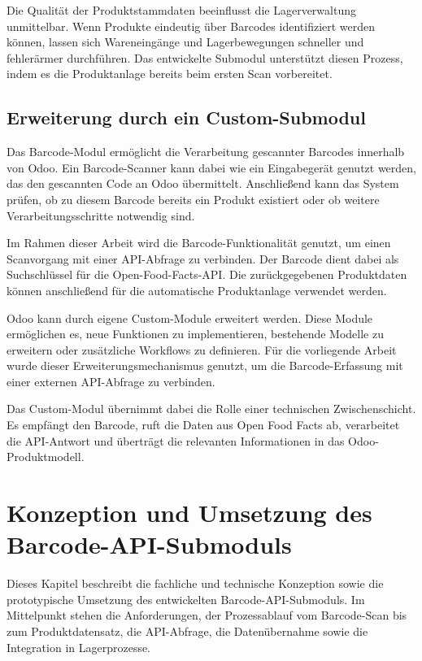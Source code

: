 \documentclass[12pt,a4paper]{article}
\begin{document}
Die Qualität der Produktstammdaten beeinflusst die Lagerverwaltung unmittelbar. Wenn Produkte eindeutig über Barcodes identifiziert werden können, lassen sich Wareneingänge und Lagerbewegungen schneller und fehlerärmer durchführen. Das entwickelte Submodul unterstützt diesen Prozess, indem es die Produktanlage bereits beim ersten Scan vorbereitet.

\subsection{Erweiterung durch ein Custom-Submodul}

Das Barcode-Modul ermöglicht die Verarbeitung gescannter Barcodes innerhalb von Odoo. Ein Barcode-Scanner kann dabei wie ein Eingabegerät genutzt werden, das den gescannten Code an Odoo übermittelt. Anschließend kann das System prüfen, ob zu diesem Barcode bereits ein Produkt existiert oder ob weitere Verarbeitungsschritte notwendig sind.

Im Rahmen dieser Arbeit wird die Barcode-Funktionalität genutzt, um einen Scanvorgang mit einer API-Abfrage zu verbinden. Der Barcode dient dabei als Suchschlüssel für die Open-Food-Facts-API. Die zurückgegebenen Produktdaten können anschließend für die automatische Produktanlage verwendet werden.

Odoo kann durch eigene Custom-Module erweitert werden. Diese Module ermöglichen es, neue Funktionen zu implementieren, bestehende Modelle zu erweitern oder zusätzliche Workflows zu definieren. Für die vorliegende Arbeit wurde dieser Erweiterungsmechanismus genutzt, um die Barcode-Erfassung mit einer externen API-Abfrage zu verbinden.

Das Custom-Modul übernimmt dabei die Rolle einer technischen Zwischenschicht. Es empfängt den Barcode, ruft die Daten aus Open Food Facts ab, verarbeitet die API-Antwort und überträgt die relevanten Informationen in das Odoo-Produktmodell.

\section{Konzeption und Umsetzung des Barcode-API-Submoduls}

Dieses Kapitel beschreibt die fachliche und technische Konzeption sowie die prototypische Umsetzung des entwickelten Barcode-API-Submoduls. Im Mittelpunkt stehen die Anforderungen, der Prozessablauf vom Barcode-Scan bis zum Produktdatensatz, die API-Abfrage, die Datenübernahme sowie die Integration in Lagerprozesse.
\end{document}
